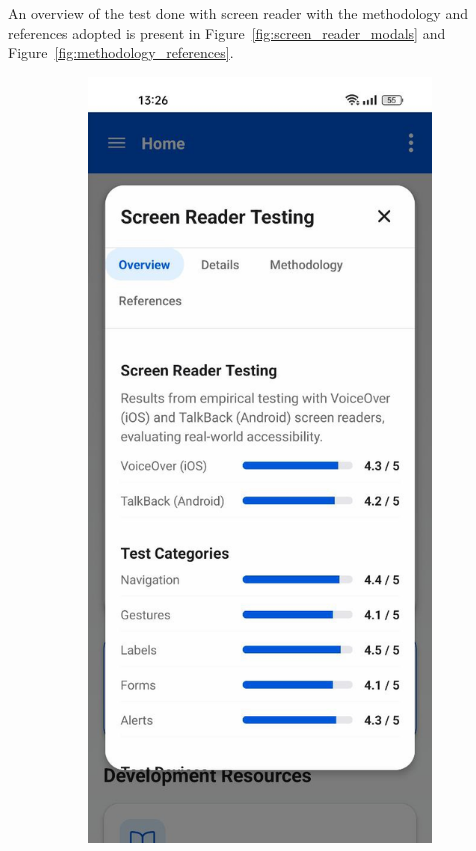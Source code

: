 \FloatBarrier

An overview of the test done with screen reader with the methodology and references adopted is present in Figure~\ref{fig:screen_reader_modals} and Figure~\ref{fig:methodology_references}.

\begin{figure}[ht]
    \centering
    \begin{subfigure}[b]{0.48\textwidth}
        \centering
        \includegraphics[width=\linewidth]{img/screen-reader-modal.jpg}

\end{subfigure}
\end{figure}
